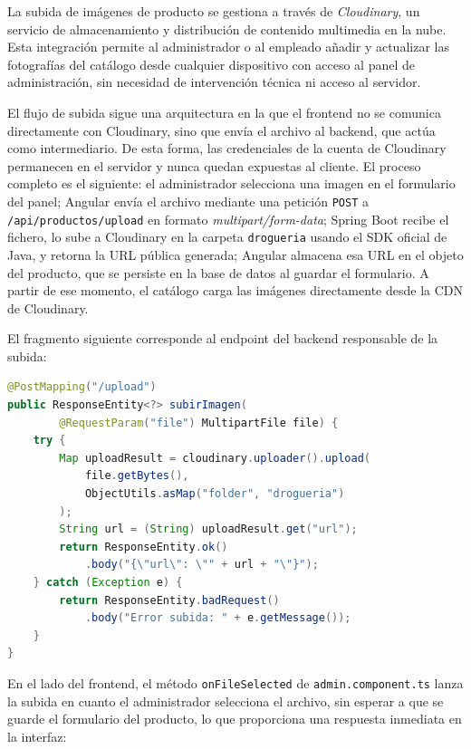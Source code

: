 La subida de imágenes de producto se gestiona a través de \textit{Cloudinary}, un servicio de almacenamiento y distribución de contenido multimedia en la nube. Esta integración permite al administrador o al empleado añadir y actualizar las fotografías del catálogo desde cualquier dispositivo con acceso al panel de administración, sin necesidad de intervención técnica ni acceso al servidor.

El flujo de subida sigue una arquitectura en la que el frontend no se comunica directamente con Cloudinary, sino que envía el archivo al backend, que actúa como intermediario. De esta forma, las credenciales de la cuenta de Cloudinary permanecen en el servidor y nunca quedan expuestas al cliente. El proceso completo es el siguiente: el administrador selecciona una imagen en el formulario del panel; Angular envía el archivo mediante una petición \texttt{POST} a \texttt{/api/productos/upload} en formato \textit{multipart/form-data}; Spring Boot recibe el fichero, lo sube a Cloudinary en la carpeta \texttt{drogueria} usando el SDK oficial de Java, y retorna la URL pública generada; Angular almacena esa URL en el objeto del producto, que se persiste en la base de datos al guardar el formulario. A partir de ese momento, el catálogo carga las imágenes directamente desde la CDN de Cloudinary.

El fragmento siguiente corresponde al endpoint del backend responsable de la subida:

\begin{lstlisting}[language=Java, caption={Endpoint de subida de imágenes a Cloudinary (ProductoController.java).}]
@PostMapping("/upload")
public ResponseEntity<?> subirImagen(
        @RequestParam("file") MultipartFile file) {
    try {
        Map uploadResult = cloudinary.uploader().upload(
            file.getBytes(),
            ObjectUtils.asMap("folder", "drogueria")
        );
        String url = (String) uploadResult.get("url");
        return ResponseEntity.ok()
            .body("{\"url\": \"" + url + "\"}");
    } catch (Exception e) {
        return ResponseEntity.badRequest()
            .body("Error subida: " + e.getMessage());
    }
}
\end{lstlisting}

En el lado del frontend, el método \texttt{onFileSelected} de \texttt{admin.component.ts} lanza la subida en cuanto el administrador selecciona el archivo, sin esperar a que se guarde el formulario del producto, lo que proporciona una respuesta inmediata en la interfaz:

